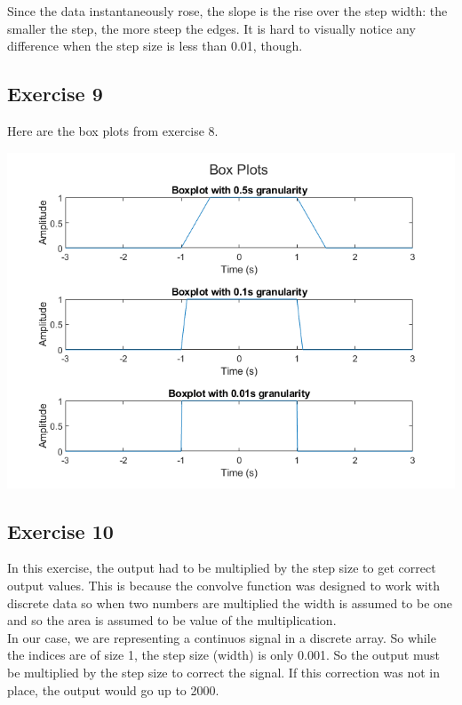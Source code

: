\documentclass[11pt]{article}
\begin{document}
Since the data instantaneously rose, the slope is the rise over the step width: the smaller the step, the more steep the edges.
It is hard to visually notice any difference when the step size is less than 0.01, though.\\



\pagebreak
\subsection{Exercise 9}

Here are the box plots from exercise 8.

\includegraphics[width=\textwidth]{exercise8.png}

\subsection{Exercise 10}

In this exercise, the output had to be multiplied by the step size to get correct output values.
This is because the convolve function was designed to work with discrete data so when two numbers are multiplied the width is assumed to be one and so the area is assumed to be value of the multiplication.\\

In our case, we are representing a continuos signal in a discrete array.
So while the indices are of size 1, the step size (width) is only 0.001.
So the output must be multiplied by the step size to correct the signal.
If this correction was not in place, the output would go up to 2000.\\
\end{document}
